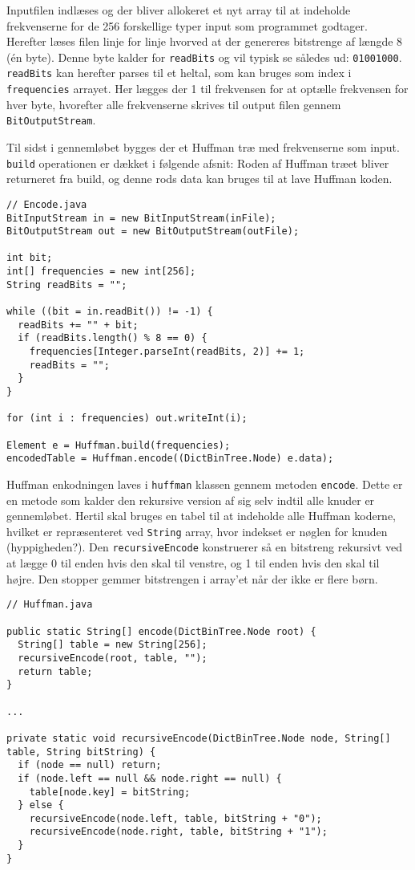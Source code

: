 \documentclass{article}
\begin{document}
Inputfilen indlæses og der bliver allokeret et nyt array til at indeholde frekvenserne for de 256 forskellige typer input som programmet godtager. Herefter læses filen linje for linje hvorved at der genereres bitstrenge af længde 8 (én byte). Denne byte kalder for \texttt{readBits} og vil typisk se således ud: \texttt{01001000}. \texttt{readBits} kan herefter parses til et heltal, som kan bruges som index i \texttt{frequencies} arrayet. Her lægges der 1 til frekvensen for at optælle frekvensen for hver byte, hvorefter alle frekvenserne skrives til output filen gennem \texttt{BitOutputStream}.

Til sidst i gennemløbet bygges der et Huffman træ med frekvenserne som input. \texttt{build} operationen er dækket i følgende afsnit: %
Roden af Huffman træet bliver returneret fra build, og denne rods data kan bruges til at lave Huffman koden.

\begin{lstlisting}
// Encode.java
BitInputStream in = new BitInputStream(inFile);
BitOutputStream out = new BitOutputStream(outFile);

int bit;
int[] frequencies = new int[256];
String readBits = "";

while ((bit = in.readBit()) != -1) {
  readBits += "" + bit;
  if (readBits.length() % 8 == 0) {
    frequencies[Integer.parseInt(readBits, 2)] += 1;
    readBits = "";
  }
}

for (int i : frequencies) out.writeInt(i);

Element e = Huffman.build(frequencies);
encodedTable = Huffman.encode((DictBinTree.Node) e.data);
\end{lstlisting}

\newpage
Huffman enkodningen laves i \texttt{huffman} klassen gennem metoden \texttt{encode}. Dette er en metode som kalder den rekursive version af sig selv indtil alle knuder er gennemløbet. Hertil skal bruges en tabel til at indeholde alle Huffman koderne, hvilket er repræsenteret ved \texttt{String} array, hvor indekset er nøglen for knuden (hyppigheden?). Den \texttt{recursiveEncode} konstruerer så en bitstreng rekursivt ved at lægge 0 til enden hvis den skal til venstre, og 1 til enden hvis den skal til højre. Den stopper gemmer bitstrengen i array'et når der ikke er flere børn.

\begin{lstlisting}
// Huffman.java

public static String[] encode(DictBinTree.Node root) {
  String[] table = new String[256];
  recursiveEncode(root, table, "");
  return table;
}

...

private static void recursiveEncode(DictBinTree.Node node, String[] table, String bitString) {
  if (node == null) return;
  if (node.left == null && node.right == null) {
    table[node.key] = bitString;
  } else {
    recursiveEncode(node.left, table, bitString + "0");
    recursiveEncode(node.right, table, bitString + "1");
  }
}
\end{lstlisting}
\end{document}
